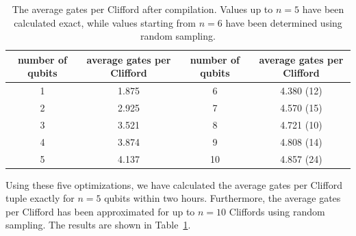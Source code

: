     \begin{table}
      \begin{tabular}{c c || c c}
        \toprule
        number of qubits  & average gates per Clifford & number of qubits  & average gates per Clifford \\
        \midrule
        1 & 1.875 & 6  & 4.380 (12)\\
        2 & 2.925 & 7  & 4.570 (15)\\
        3 & 3.521 & 8  & 4.721 (10)\\
        4 & 3.874 & 9  & 4.808 (14)\\
        5 & 4.137 & 10 & 4.857 (24)\\
        \bottomrule
      \end{tabular}
      \caption{The average gates per Clifford after compilation. Values up to $n=5$ have been calculated exact, while values starting from $n=6$ have been determined using random sampling.}
      \label{tab:gates per Clifford}
    \end{table}

    Using these five optimizations, we have calculated the average gates per Clifford tuple exactly for $n=5$ qubits within two hours. Furthermore, the average gates per Clifford has been approximated for up to $n=10$ Cliffords using random sampling. The results are shown in Table~\ref{tab:gates per Clifford}.
